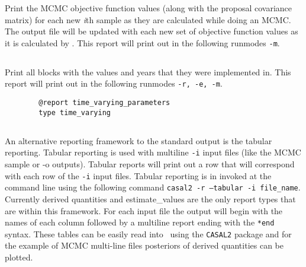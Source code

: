 Print the MCMC objective function values (along with the proposal covariance matrix) for each new \textit{i}th sample as they are calculated while doing an MCMC. The output file will be updated with each new set of objective function values as it is calculated by \CNAME. This report will print out in the following runmodes \texttt{-m}.

\subsection{}

Print all  blocks with the values and years that they were implemented in. This report will print out in the following runmodes \texttt{-r, -e, -m}.

{\small{\begin{verbatim}
		@report time_varying_parameters
		type time_varying
		\end{verbatim}}}

\subsection{}
An alternative reporting framework to the standard output is the tabular reporting. Tabular reporting is used with multiline \texttt{-i} input files (like the MCMC sample or -o outputs). Tabular reports will print out a row that will correspond with each row of the \texttt{-i} input files. Tabular reporting is in invoked at the command line using the following command \texttt{casal2 -r --tabular -i file\_name}. Currently derived quantities and estimate\_values are the only report types that are within this framework. For each input file the output will begin with the names of each column followed by a multiline report ending with the \texttt{*end} syntax. These tables can be easily read into \R\ using the \texttt{CASAL2} package and for the example of MCMC multi-line files posteriors of derived quantities can be plotted.


